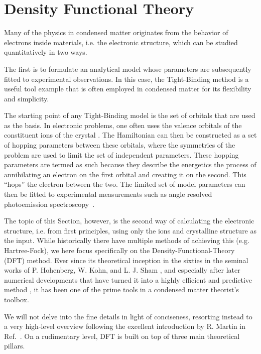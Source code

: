 \chapter{Density Functional Theory \label{ch:DFT}}
Many of the physics in condensed matter originates from the behavior of electrons inside materials, i.e. the electronic structure, which can be studied quantitatively in two ways.

The first is to formulate an analytical model whose parameters are subsequently fitted to experimental observations. 
In this case, the Tight-Binding method is a useful tool example that is often employed in condensed matter for its flexibility and simplicity.

The starting point of any Tight-Binding model is the set of orbitals that are used as the basis.
In electronic problems, one often uses the valence orbitals of the constituent ions of the crystal \cite{Bloch1929,Slater1954}.
The Hamiltonian can then be constructed as a set of hopping parameters between these orbitals, where the symmetries of the problem are used to limit the set of independent parameters.
These hopping parameters are termed as such because they describe the energetics the process of annihilating an electron on the first orbital and creating it on the second.
This ``hops'' the electron between the two.
The limited set of model parameters can then be fitted to experimental measurements such as angle resolved photoemission spectroscopy~\cite{Damascelli2004}.

The topic of this Section, however, is the second way of calculating the electronic structure, i.e. from first principles, using only the ions and crystalline structure as the input. 
While historically there have multiple methods of achieving this (e.g. Hartree-Fock), we here focus specifically on the Density-Functional-Theory (DFT) method.
Ever since its theoretical inception in the sixties in the seminal works of P. Hohenberg, W. Kohn, and L. J. Sham  \cite{Hohenberg1964,Kohn1965}, and especially after later numerical developments that have turned it into a highly efficient and predictive method \cite{Hamann1979,Louie1982,Vanderbilt1990,Joubert1999,Perdew1985,Perdew1986,Perdew1993}, it has been one of the prime tools in a condensed matter theorist's toolbox.

We will not delve into the fine details in light of conciseness, resorting instead to a very high-level overview following the excellent introduction by R. Martin in Ref.~\cite{Martin2004}.
On a rudimentary level, DFT is built on top of three main theoretical pillars.

